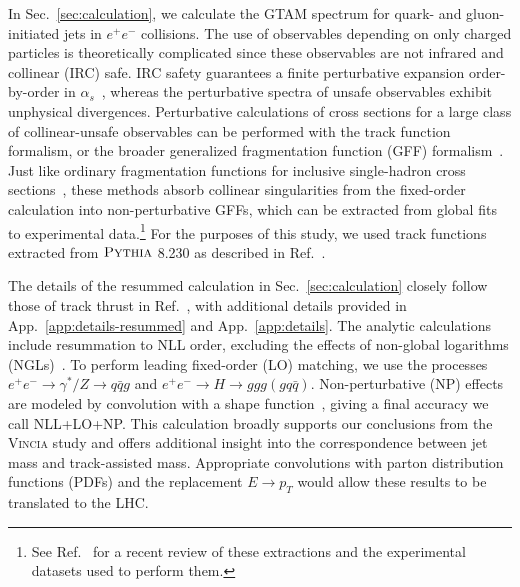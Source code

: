 \documentclass[letterpaper,11pt]{article}
\newcommand{\Ref}[1]{Ref.~\cite{#1}}
\newcommand{\Sec}[1]{Sec.~\ref{#1}}
\newcommand{\App}[1]{App.~\ref{#1}}
\begin{document}

In \Sec{sec:calculation}, we calculate the GTAM spectrum for quark- and gluon-initiated jets in $e^+e^-$ collisions.
%
The use of observables depending on only charged particles is theoretically complicated since these observables are not infrared and collinear (IRC) safe.
%
IRC safety guarantees a finite perturbative expansion order-by-order in $\alpha_s$~\cite{Sterman:1977wj}, whereas the perturbative spectra of unsafe observables exhibit unphysical divergences. 
%
Perturbative calculations of cross sections for a large class of collinear-unsafe observables can be performed with the track function formalism, or the broader generalized fragmentation function (GFF) formalism~\cite{Waalewijn:2012sv,Krohn:2012fg,Chang:2013rca,Chang:2013iba,Larkoski:2014pca,Elder:2017bkd}.
%
Just like ordinary fragmentation functions for inclusive single-hadron cross sections~\cite{Berman:1971xz,Mueller:1978xu,Mueller:1981sg,Collins:1981uk,Collins:1981uw,Brock:1993sz,Collins:2011zzd}, these methods absorb collinear singularities from the fixed-order calculation into non-perturbative GFFs, which can be extracted from global fits to experimental data.\footnote{See \Ref{Metz:2016swz} for a recent review of these extractions and the experimental datasets used to perform them.} 
%
For the purposes of this study, we used track functions extracted from $\textsc{Pythia}$ 8.230 as described in \Ref{Elder:2017bkd}. 

The details of the resummed calculation in \Sec{sec:calculation} closely follow those of track thrust in \Ref{Chang:2013iba}, with additional details provided in \App{app:details-resummed} and \App{app:details}.
%
The analytic calculations include resummation to NLL order, excluding the effects of non-global logarithms (NGLs)~\cite{Dasgupta:2001sh}. 
%
To perform leading fixed-order (LO) matching, we use the processes $e^+e^-\rightarrow \gamma^*/Z \rightarrow q\bar{q}g$ and $e^+e^-\rightarrow H \rightarrow ggg (gq\bar{q})$.
%
Non-perturbative (NP) effects are modeled by convolution with a shape function~\cite{Korchemsky:1999kt,Korchemsky:2000kp}, giving a final accuracy we call NLL+LO+NP.  
%
This calculation broadly supports our conclusions from the \textsc{Vincia} study and offers additional insight into the correspondence between jet mass and track-assisted mass. 
%
Appropriate convolutions with parton distribution functions (PDFs) and the replacement $E\rightarrow p_T$ would allow these results to be translated to the LHC.
\end{document}
